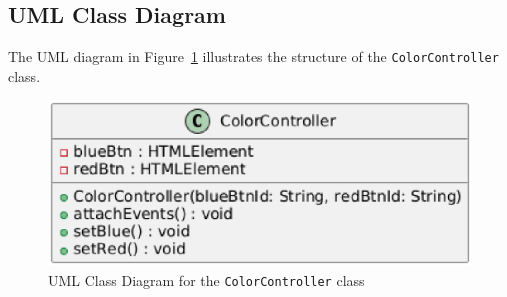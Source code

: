 \subsection{UML Class Diagram}

The UML diagram in Figure~\ref{fig:uml-colorcontroller} illustrates the structure of the 
\texttt{ColorController} class.

\begin{figure}[h]
  \centering
  \includegraphics[width=0.6\linewidth]{eps/ColorControllerUML.eps}
  \caption{UML Class Diagram for the \texttt{ColorController} class}
  \label{fig:uml-colorcontroller}
\end{figure}
